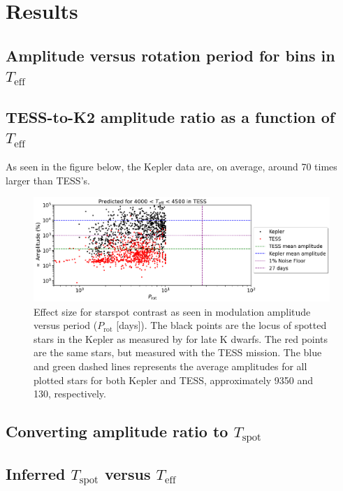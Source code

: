 \documentclass[modern]{aastex631}
\begin{document}
\section{Results}

\subsection{Amplitude versus rotation period for bins in $T_{\mathrm{eff}}$}

\subsection{TESS-to-K2 amplitude ratio as a function of $T_{\mathrm{eff}}$}

As seen in the figure below, the Kepler data are, on average, around 70 times larger than TESS's.

\begin{figure}[!htb]
  \centering
  \includegraphics[scale=0.42]{Amplitude vs. Rotation for Kepler and TESS.png}
  \caption{Effect size for starspot contrast as seen in modulation amplitude versus period ($P_{\mathrm{rot}}$ [days]). The black points are the locus of spotted stars in the Kepler as measured by for late K dwarfs. The red points are the same stars, but measured with the TESS mission. The blue and green dashed lines represents the average amplitudes for all plotted stars for both Kepler and TESS, approximately 9350 and 130, respectively.}
\end{figure}
\FloatBarrier

\subsection{Converting amplitude ratio to $T_{\mathrm{spot}}$}

\subsection{Inferred $T_{\mathrm{spot}}$ versus $T_{\mathrm{eff}}$}
\end{document}
